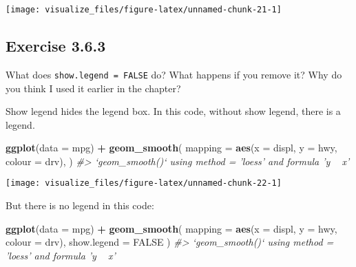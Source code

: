 \documentclass[]{book}
\newenvironment{Shaded}{\begin{snugshade}}{\end{snugshade}}
\newcommand{\CommentTok}[1]{\textcolor[rgb]{0.56,0.35,0.01}{\textit{#1}}}
\newcommand{\DataTypeTok}[1]{\textcolor[rgb]{0.13,0.29,0.53}{#1}}
\newcommand{\KeywordTok}[1]{\textcolor[rgb]{0.13,0.29,0.53}{\textbf{#1}}}
\newcommand{\NormalTok}[1]{#1}
\newcommand{\OperatorTok}[1]{\textcolor[rgb]{0.81,0.36,0.00}{\textbf{#1}}}
\newcommand{\OtherTok}[1]{\textcolor[rgb]{0.56,0.35,0.01}{#1}}
\newcommand{\StringTok}[1]{\textcolor[rgb]{0.31,0.60,0.02}{#1}}
\theoremstyle{plain}
\theoremstyle{remark}
\begin{document}
\begin{center}\texttt{[image: visualize\_files/figure-latex/unnamed-chunk-21-1]} \end{center}

\hypertarget{exercise-3.6.3}{%
\subsection*{\texorpdfstring{Exercise
{3.6.3}}{Exercise 3.6.3}}\label{exercise-3.6.3}}

What does \texttt{show.legend\ =\ FALSE} do? What happens if you remove
it? Why do you think I used it earlier in the chapter?

Show legend hides the legend box. In this code, without show legend,
there is a legend.

\begin{Shaded}
\begin{Highlighting}[]
\KeywordTok{ggplot}\NormalTok{(}\DataTypeTok{data =}\NormalTok{ mpg) }\OperatorTok{+}
\StringTok{  }\KeywordTok{geom_smooth}\NormalTok{(}
    \DataTypeTok{mapping =} \KeywordTok{aes}\NormalTok{(}\DataTypeTok{x =}\NormalTok{ displ, }\DataTypeTok{y =}\NormalTok{ hwy, }\DataTypeTok{colour =}\NormalTok{ drv),}
\NormalTok{  )}
\CommentTok{#> `geom_smooth()` using method = 'loess' and formula 'y ~ x'}
\end{Highlighting}
\end{Shaded}

\begin{center}\texttt{[image: visualize\_files/figure-latex/unnamed-chunk-22-1]} \end{center}

But there is no legend in this code:

\begin{Shaded}
\begin{Highlighting}[]
\KeywordTok{ggplot}\NormalTok{(}\DataTypeTok{data =}\NormalTok{ mpg) }\OperatorTok{+}
\StringTok{  }\KeywordTok{geom_smooth}\NormalTok{(}
    \DataTypeTok{mapping =} \KeywordTok{aes}\NormalTok{(}\DataTypeTok{x =}\NormalTok{ displ, }\DataTypeTok{y =}\NormalTok{ hwy, }\DataTypeTok{colour =}\NormalTok{ drv),}
    \DataTypeTok{show.legend =} \OtherTok{FALSE}
\NormalTok{  )}
\CommentTok{#> `geom_smooth()` using method = 'loess' and formula 'y ~ x'}
\end{Highlighting}
\end{Shaded}
\end{document}
